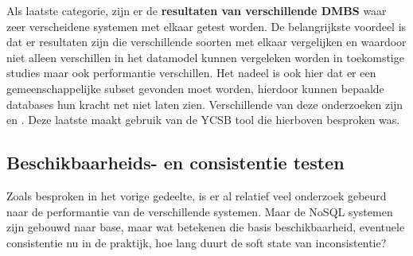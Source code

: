 Als laatste categorie, zijn er de \textbf{resultaten van verschillende DMBS} waar zeer verscheidene systemen met elkaar getest worden. De belangrijkste voordeel is dat er resultaten zijn die verschillende soorten met elkaar vergelijken en waardoor niet alleen verschillen in het datamodel kunnen vergeleken worden in toekomstige studies maar ook performantie verschillen. Het nadeel is ook hier dat er een gemeenschappelijke subset gevonden moet worden, hierdoor kunnen bepaalde databases hun kracht net niet laten zien. Verschillende van deze onderzoeken zijn \cite{tudorica2011comparison} en \cite{rabl2012solving}. Deze laatste maakt gebruik van de YCSB tool die hierboven besproken was. 

\subsection{Beschikbaarheids- en consistentie testen}
Zoals besproken in het vorige gedeelte, is er al relatief veel onderzoek gebeurd naar de performantie van de verschillende systemen. Maar de NoSQL systemen zijn gebouwd naar \gls{base}, maar wat betekenen die basis beschikbaarheid, eventuele consistentie nu in de praktijk, hoe lang duurt de soft state van inconsistentie?

  
